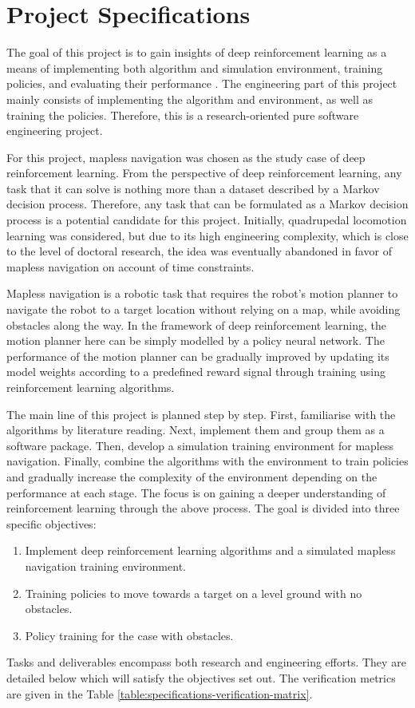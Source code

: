 \section{Project Specifications} \label{sec:spec}

The goal of this project is to gain insights of deep reinforcement learning as a means of implementing both algorithm and simulation environment,  training policies, and evaluating their performance \cite{ref:spec-report}. The engineering part of this project mainly consists of implementing the algorithm and environment, as well as training the policies. Therefore, this is a research-oriented pure software engineering project.

For this project, mapless navigation was chosen as the study case of deep reinforcement learning. From the perspective of deep reinforcement learning, any task that it can solve is nothing more than a dataset described by a Markov decision process. Therefore, any task that can be formulated as a Markov decision process is a potential candidate for this project. Initially, quadrupedal locomotion learning was considered, but due to its high engineering complexity, which is close to the level of doctoral research, the idea was eventually abandoned in favor of mapless navigation on account of time constraints.

Mapless navigation is a robotic task that requires the robot's motion planner to navigate the robot to a target location without relying on a map, while avoiding obstacles along the way. In the framework of deep reinforcement learning, the motion planner here can be simply modelled by a policy neural network. The performance of the motion planner can be gradually improved by updating its model weights according to a predefined reward signal through training using reinforcement learning algorithms.

The main line of this project is planned step by step. First, familiarise with the algorithms by literature reading. Next, implement them and group them as a software package. Then, develop a simulation training environment for mapless navigation. Finally, combine the algorithms with the environment to train policies and gradually increase the complexity of the environment depending on the performance at each stage. The focus is on gaining a deeper understanding of reinforcement learning through the above process. The goal is divided into three specific objectives:
\begin{enumerate}[label=\arabic*), nosep, leftmargin=*]
    \item Implement deep reinforcement learning algorithms and a simulated mapless navigation training environment.
    \item Training policies to move towards a target on a level ground with no obstacles.
    \item Policy training for the case with obstacles.
\end{enumerate}
Tasks and deliverables encompass both research and engineering efforts. They are detailed below which will satisfy the objectives set out. The verification metrics are given in the Table \ref{table:specifications-verification-matrix}.

